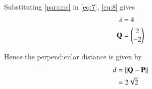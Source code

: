 \documentclass[journal,12pt,twocolumn]{IEEEtran}
\begin{document}
\begin{enumerate}
Substituting \eqref{params} in \eqref{eq:7}, \eqref{eq:8} gives
\begin{align}
\lambda &= 4 \\
\mathbf{Q} &= \begin{pmatrix}2 \\-2\end{pmatrix}
\end{align}
    
Hence the perpendicular distance is given by
\begin{align}
d &= \left\lVert\mathbf{Q}-\mathbf{P}\right\rVert\\
&= 2\sqrt{2}
\end{align}
\end{enumerate}
\end{document}
